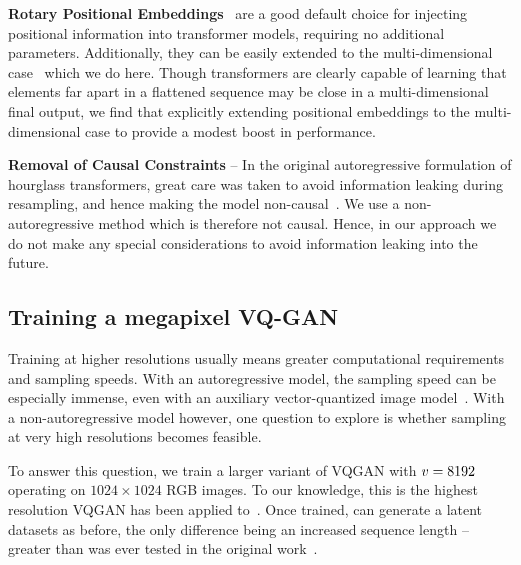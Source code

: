 
\textbf{Rotary Positional Embeddings}~\cite{su2021roformer} are a good default
choice for injecting positional information into transformer models, requiring
no additional parameters. Additionally, they can be easily extended to the
multi-dimensional case~\cite{rope-eleutherai} which we do here. Though
transformers are clearly capable of learning that elements far apart in a
flattened sequence may be close in a multi-dimensional final output, we find
that explicitly extending positional embeddings to the multi-dimensional case to
provide a modest boost in performance.


\textbf{Removal of Causal Constraints} -- In the original autoregressive
formulation of hourglass transformers, great care was taken to avoid information
leaking during resampling, and hence making the model
non-causal~\cite{nawrot2021hierarchical}. We use a non-autoregressive method
which is therefore not causal. Hence, in our approach we do not make any special
considerations to avoid information leaking into the future.


\subsection{Training a megapixel VQ-GAN}
\label{sec:megagan}

Training at higher resolutions usually means greater computational requirements
and sampling speeds. With an autoregressive model, the sampling speed can be
especially immense, even with an auxiliary vector-quantized image
model~\cite{esser2021taming}. With a non-autoregressive model however, one
question to explore is whether sampling at very high resolutions becomes
feasible.

To answer this question, we train a larger variant of VQGAN with
$v = 8192$ operating on $1024 \times 1024$ RGB images. To our
knowledge, this is the highest resolution VQGAN has been applied
to~\cite{esser2021taming}. Once trained, can generate a latent datasets as
before, the only difference being an increased sequence length -- greater than
was ever tested in the original work~\cite{savinov2022stepunrolled}.

